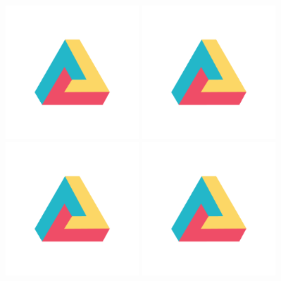\documentclass[22pt]{beamer}
\begin{document}
\begin{frame}[fragile]
\begin{textblock}{7.25}

\begin{figure}[htbp]
\centering
\includegraphics[height=5cm]{dh.png}
\hspace{1cm}
\includegraphics[height=5cm]{dh.png}
\hspace{1cm}
\includegraphics[height=5cm]{dh.png}
\hspace{1cm}
\includegraphics[height=5cm]{dh.png}
\end{figure}
\end{textblock}


\end{frame}
\end{document}
